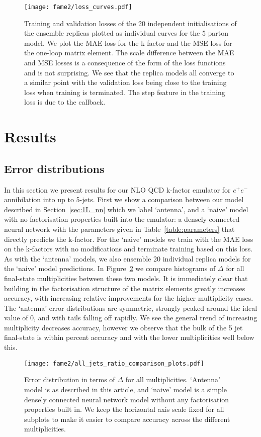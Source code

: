 \documentclass[main.tex]{subfiles}
\begin{document}
\begin{figure}
    \centering
    \texttt{[image: fame2/loss\_curves.pdf]}
    \caption{Training and validation losses of the 20 independent
    initialisations of the ensemble replicas plotted as individual
    curves for the 5 parton model. We plot the MAE loss for the k-factor
    and the MSE loss for the one-loop matrix element. The scale difference
    between the MAE and MSE losses is a consequence of the form of the loss
    functions and is not surprising.
    We see that the replica models all converge
    to a similar point with the validation loss being close to the training loss
    when training is terminated. The step feature in the training loss
    is due to the {\ReduceLROnPlateau} callback.}
    \label{fig:1L_loss_curves}
\end{figure}

\section{Results}\label{sec:1L_results}
\subsection{Error distributions}
In this section we present results for our NLO QCD k-factor
emulator for $e^{+}e^{-}$ annihilation into up to 5-jets.
First we show a comparison between our model described in
Section~\ref{sec:1L_nn} which we label `antenna',
and a `naive' model with no factorisation properties built
into the emulator: a densely connected neural network
with the parameters given in Table~\ref{table:parameters}
that directly predicts the k-factor.
For the `naive' models we train with the MAE loss on the k-factors
with no modifications and terminate training
based on this loss. As with the `antenna' models, we also
ensemble 20 individual replica models for the `naive' model predictions.
In Figure~\ref{fig:1L_delta_distribution} we compare histograms
of $\Delta$ for all final-state multiplicities between these two models.
It is immediately clear that building
in the factorisation structure of the matrix elements greatly increases
accuracy, with increasing relative improvements
for the higher multiplicity cases.
The `antenna' error distributions are symmetric, strongly peaked around
the ideal value of 0, and with tails falling off rapidly. We
see the general trend of increasing multiplicity decreases accuracy,
however we observe that the bulk of the 5 jet final-state is
within percent accuracy and with the lower multiplicities well
below this.
\begin{figure}
    \centering
    \texttt{[image: fame2/all\_jets\_ratio\_comparison\_plots.pdf]}
    \caption{Error distribution in terms of $\Delta$ for all multiplicities. `Antenna'
    model is as described in this article, and `naive' model is a simple densely connected
    neural network model without any factorisation properties built in.
    We keep the horizontal axis scale fixed for all subplots to make it easier to compare
    accuracy across the different multiplicities.}
    \label{fig:1L_delta_distribution}
\end{figure}
\end{document}
